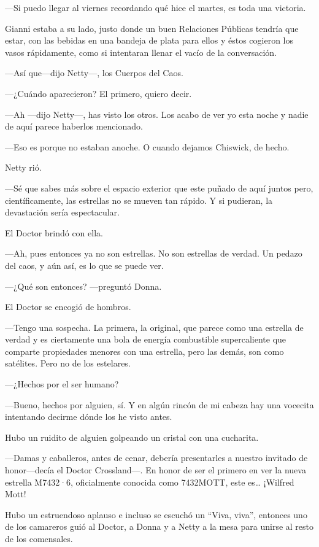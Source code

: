---Si puedo llegar al viernes recordando qué hice el martes, es toda una
victoria.

Gianni estaba a su lado, justo donde un buen Relaciones Públicas tendría
que estar, con las bebidas en una bandeja de plata para ellos y éstos
cogieron los vasos rápidamente, como si intentaran llenar el vacío de la
conversación.

---Así que---dijo Netty---, los Cuerpos del Caos.

---¿Cuándo aparecieron? El primero, quiero decir.

---Ah ---dijo Netty---, has visto los otros. Los acabo de ver yo esta
noche y nadie de aquí parece haberlos mencionado.

---Eso es porque no estaban anoche. O cuando dejamos Chiswick, de hecho.

Netty rió.

---Sé que sabes más sobre el espacio exterior que este puñado de aquí
juntos pero, científicamente, las estrellas no se mueven tan rápido. Y
si pudieran, la devastación sería espectacular.

El Doctor brindó con ella.

---Ah, pues entonces ya no son estrellas. No son estrellas de verdad. Un
pedazo del caos, y aún así, es lo que se puede ver.

---¿Qué son entonces? ---preguntó Donna.

El Doctor se encogió de hombros.

---Tengo una sospecha. La primera, la original, que parece como una
estrella de verdad y es ciertamente una bola de energía combustible
supercaliente que comparte propiedades menores con una estrella, pero
las demás, son como satélites. Pero no de los estelares.

---¿Hechos por el ser humano?

---Bueno, hechos por alguien, sí. Y en algún rincón de mi cabeza hay una
vocecita intentando decirme dónde los he visto antes.

Hubo un ruidito de alguien golpeando un cristal con una cucharita.

---Damas y caballeros, antes de cenar, debería presentarles a nuestro
invitado de honor---decía el Doctor Crossland---. En honor de ser el
primero en ver la nueva estrella M7432·6, oficialmente conocida como
7432MOTT, este es\ldots{} ¡Wilfred Mott!

Hubo un estruendoso aplauso e incluso se escuchó un ``Viva, viva'',
entonces uno de los camareros guió al Doctor, a Donna y a Netty a la
mesa para unirse al resto de los comensales.


